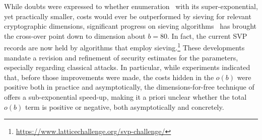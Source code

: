 \documentclass{iacrcc}
\begin{document}
While doubts were expressed to whether enumeration~\cite{AC:CheNgu11} with its super-exponential, yet practically smaller, costs would ever be outperformed by sieving for relevant cryptographic dimensions, significant progress on sieving algorithms~\cite{ducas2018shortest,albrecht2019general} has brought the cross-over point down to dimension about $b = 80$. In fact, the current SVP records are now held by algorithms that employ sieving.\footnote{\url{https://www.latticechallenge.org/svp-challenge/}} These developments mandate a revision and refinement of security estimates for the \FrodoKEM parameters, especially regarding classical attacks. In particular, while experiments indicated that, before those improvements were made, the costs hidden in the $o(b)$ were positive both in practice and asymptotically, the dimensions-for-free technique of~\cite{ducas2018shortest} offers a sub-exponential speed-up, making it a priori unclear whether the total $o(b)$ term is positive or negative, both asymptotically and concretely.
\end{document}
